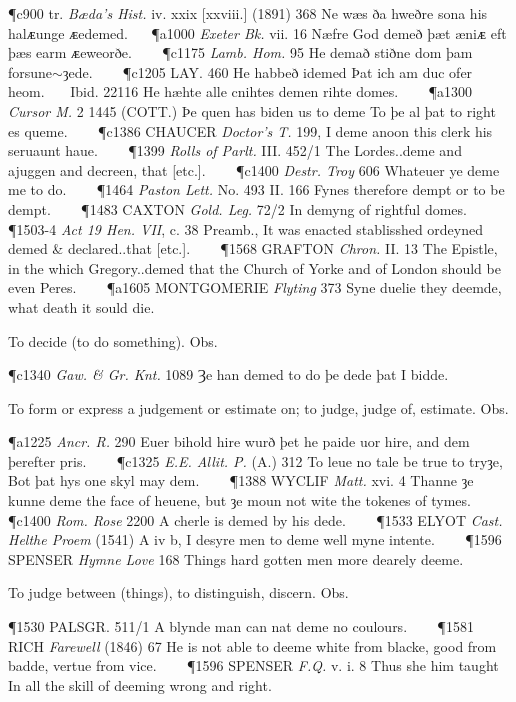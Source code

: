 \begin{description}[wide, labelwidth=!, labelindent=0pt]
\begin{myenumerate}
\P c900 tr. \textit{Bæda's Hist.} iv. xxix [xxviii.] (1891) 368 Ne wæs ða hweðre sona his halᴁunge ᴁedemed.   
\P a1000 \textit{Exeter  Bk.} vii. 16 Næfre God demeð þæt æniᴁ eft þæs earm ᴁeweorðe.    
\P c1175  \textit{Lamb. Hom.} 95 He demað stiðne dom þam forsune$\sim$ȝede.    
\P c1205 LAY. 460 He habbeð idemed Þat ich am duc ofer heom.    Ibid. 22116 He hæhte alle cnihtes demen rihte domes.    
\P a1300  \textit{Cursor M.} 2 1445 (COTT.)  Þe quen has biden us to deme To þe al þat to right es queme.    
\P c1386 CHAUCER  \textit{Doctor's T.} 199, I deme anoon this clerk his seruaunt haue.    
\P 1399  \textit{Rolls of Parlt.} III. 452/1 The Lordes..deme and ajuggen and decreen, that [etc.].    
\P c1400  \textit{Destr. Troy} 606 Whateuer ye deme me to do.    
\P 1464 \textit{Paston  Lett.} No. 493 II. 166 Fynes therefore dempt or to be dempt.    
\P 1483 CAXTON  \textit{Gold. Leg.} 72/2 In demyng of rightful domes.    
\P 1503-4  \textit{Act 19 Hen. VII}, c. 38 Preamb., It was enacted stablisshed ordeyned demed \& declared..that [etc.].    
\P 1568 GRAFTON  \textit{Chron.} II. 13 The Epistle, in the which Gregory..demed that the Church of Yorke and of London should be even Peres.    
\P a1605 MONTGOMERIE  \textit{Flyting} 373 Syne duelie they deemde, what death it sould die.

 To decide (to do something). Obs.

\P c1340  \textit{Gaw. \& Gr. Knt.} 1089 Ȝe  han demed to do þe dede þat I bidde.

 To form or express a judgement or estimate on; to judge, judge of, estimate. Obs.

\P a1225  \textit{Ancr. R.} 290 Euer bihold hire wurð þet he paide uor hire, and dem þerefter pris.    
\P c1325  \textit{E.E. Allit. P.} (A.) 312 To leue no tale be true to tryȝe, Bot þat hys one skyl may dem.    
\P 1388 WYCLIF  \textit{Matt.} xvi. 4 Thanne ȝe kunne deme the face of heuene, but ȝe moun not wite the tokenes of tymes.    
\P c1400  \textit{Rom. Rose} 2200 A cherle is demed by his dede.    
\P 1533 ELYOT  \textit{Cast. Helthe Proem} (1541) A iv b, I desyre men to deme well myne intente.    
\P 1596 SPENSER  \textit{Hymne Love} 168 Things hard gotten men more dearely deeme.

 To judge between (things), to distinguish, discern. Obs.

\P 1530 PALSGR. 511/1 A blynde man can nat deme no coulours.    
\P 1581 RICH  \textit{Farewell} (1846) 67 He is not able to deeme white from blacke, good from badde, vertue from vice.    
\P 1596 SPENSER  \textit{F.Q.} v. i. 8 Thus she him taught In all the skill of deeming wrong and right.


\end{myenumerate}
\end{description}
